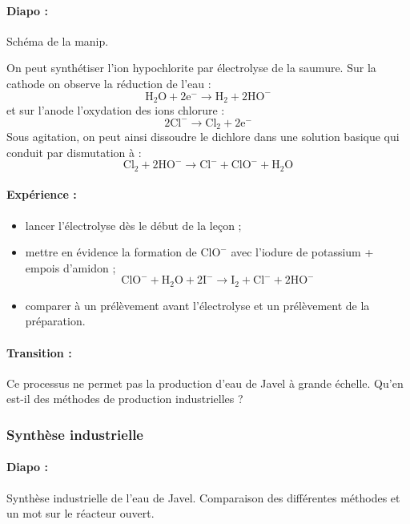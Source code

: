 \paragraph{Diapo : } Schéma de la manip.

On peut synthétiser l'ion hypochlorite par électrolyse de la saumure.
Sur la cathode on observe la réduction de l'eau :
\begin{equation*}
\mathrm{H_2O + 2e^- \rightarrow H_2 + 2HO^-}
\end{equation*}
et sur l'anode l'oxydation des ions chlorure :
\begin{equation*}
\mathrm{2Cl^- \rightarrow Cl_2 + 2e^-}
\end{equation*}
Sous agitation, on peut ainsi dissoudre le dichlore dans une solution basique qui conduit par dismutation à :
\begin{equation*}
\mathrm{Cl_2 + 2HO^- \rightarrow Cl^- + ClO^- + H_2O} 
\end{equation*}

\paragraph{Expérience : }
\begin{itemize}
\item lancer l'électrolyse dès le début de la leçon ;
\item mettre en évidence la formation de $\mathrm{ClO^-}$ avec l'iodure de potassium + empois d'amidon ;
\begin{equation*}
\mathrm{ClO^- + H_2O + 2I^- \rightarrow I_2 + Cl^- + 2HO^-} 
\end{equation*}
\item comparer à un prélèvement avant l'électrolyse et un prélèvement de la préparation.
\end{itemize}

\paragraph{Transition : } Ce processus ne permet pas la production d'eau de Javel à grande échelle.
Qu'en est-il des méthodes de production industrielles ?

\subsubsection{Synthèse industrielle}

\paragraph{Diapo :} Synthèse industrielle de l'eau de Javel.
Comparaison des différentes méthodes et un mot sur le réacteur ouvert.

